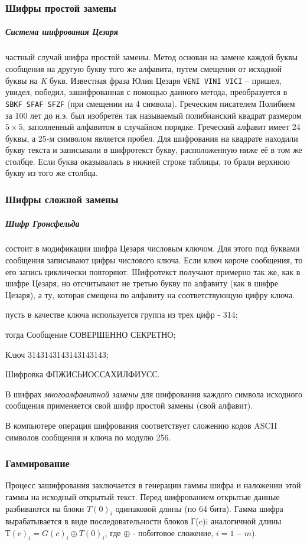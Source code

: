 \subsubsection{Шифры простой замены}

\subparagraph{Система шифрования Цезаря} частный случай шифра простой замены.
Метод основан на замене каждой буквы сообщения на другую букву того же
алфавита, путем смещения от исходной буквы на \emph{K} букв. Известная фраза
Юлия Цезаря \texttt{VENI VINI VICI} – пришел, увидел, победил, зашифрованная
с помощью данного метода, преобразуется в \texttt{SBKF SFAF SFZF} (при
смещении на 4 символа). Греческим писателем Полибием за 100 лет до н.э. был
изобретён так называемый полибианский квадрат размером $5\times 5$,
заполненный алфавитом в случайном порядке. Греческий алфавит имеет 24 буквы,
а 25-м символом является пробел. Для шифрования на квадрате находили букву
текста и записывали в шифротекст букву, расположенную ниже её в том же
столбце. Если буква оказывалась в нижней строке таблицы, то брали верхнюю
букву из того же столбца.

\subsubsection{Шифры сложной замены}

\subparagraph{Шифр Гронсфельда} состоит в модификации шифра Цезаря числовым
ключом. Для этого под буквами сообщения записывают цифры числового ключа.
Если ключ короче сообщения, то его запись циклически повторяют. Шифротекст
получают примерно так же, как в шифре Цезаря, но отсчитывают не третью букву
по алфавиту (как в шифре Цезаря), а ту, которая смещена по алфавиту на
соответствующую цифру ключа.
\begin{Notes}
  \item пусть в качестве ключа используется группа из трех цифр - 314;
  \item тогда Сообщение СОВЕРШЕННО СЕКРЕТНО;
  \item Ключ 3143143143143143143;
  \item Шифровка ФПЖИСЬИОССАХИЛФИУСС.
\end{Notes}
В шифрах \emph{многоалфавитной замены} для шифрования каждого символа
исходного сообщения применяется свой шифр простой замены (свой алфавит).

В компьютере операция шифрования соответствует сложению кодов ASCII символов
сообщения и ключа по модулю 256.

\subsubsection{Гаммирование}
Процесс зашифрования заключается в генерации гаммы шифра и наложении этой
гаммы на исходный открытый текст. Перед шифрованием открытые данные
разбиваются на блоки $T(0)_i$ одинаковой длины (по 64 бита). Гамма шифра
вырабатывается в виде последовательности блоков Г(c)i аналогичной длины
$Т(c)_i=G(c)_i \oplus T(0)_i$, где $\oplus $ - побитовое сложение, $i =1-m$).

